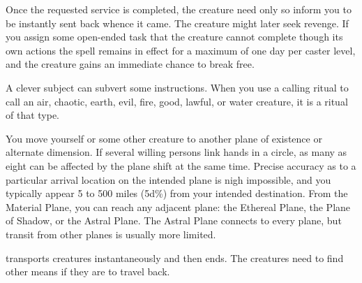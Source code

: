 \begin{spelleffect}
\par Once the requested service is completed, the creature need only so inform you to be instantly sent back whence it came. The creature might later seek revenge. If you assign some open-ended task that the creature cannot complete though its own actions the spell remains in effect for a maximum of one day per caster level, and the creature gains an immediate chance to break free.
\end{spelleffect}
\begin{spellnotes}
A clever subject can subvert some instructions. When you use a calling ritual to call an air, chaotic, earth, evil, fire, good, lawful, or water creature, it is a ritual of that type.
\end{spellnotes}

\begin{spelleffect}
You move yourself or some other creature to another plane of existence or alternate dimension. If several willing persons link hands in a circle, as many as eight can be affected by the plane shift at the same time. Precise accuracy as to a particular arrival location on the intended plane is nigh impossible, and you typically appear 5 to 500 miles (5d\%) from your intended destination. From the Material Plane, you can reach any adjacent plane: the Ethereal Plane, the Plane of Shadow, or the Astral Plane. The Astral Plane connects to every plane, but transit from other planes is usually more limited.
\end{spelleffect}
\begin{spellnotes}
 transports creatures instantaneously and then ends. The creatures need to find other means if they are to travel back.
\end{spellnotes}

